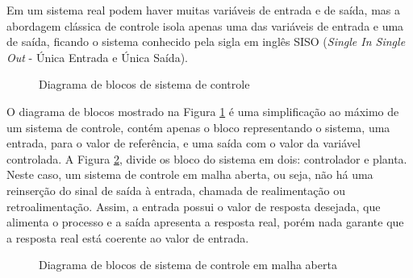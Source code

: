 Em um sistema real podem haver muitas variáveis de entrada e de saída, mas a abordagem clássica de controle isola apenas uma das variáveis de entrada e uma de saída, ficando o sistema conhecido pela sigla em inglês SISO (\emph{Single In Single Out} - Única Entrada e Única Saída).

\begin{figure}[!htb]
\centering
{}
\caption{ Diagrama de blocos de sistema de controle}
\label{fig:processo}
\end{figure}


O diagrama de blocos mostrado na Figura \ref{fig:processo} é uma simplificação ao máximo de um sistema de controle, contém apenas o bloco representando o sistema, uma entrada, para o valor de referência, e uma saída com o valor da variável controlada. A Figura \ref{fig:malhaAberta}, divide os bloco do sistema em dois: controlador e planta. Neste caso, um sistema de controle em malha aberta, ou seja, não há uma reinserção do sinal de saída à entrada, chamada de realimentação ou retroalimentação. Assim, a entrada possui o valor de resposta desejada, que alimenta o processo e a saída apresenta a resposta real, porém nada garante que a resposta real está coerente ao valor de entrada.

\begin{figure}[!htb]
\centering
{}
\caption{ Diagrama de blocos de sistema de controle em malha aberta}
\label{fig:malhaAberta}
\end{figure}

